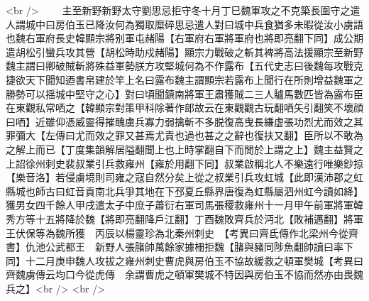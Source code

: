 <br />
　　主至新野新野太守劉思忌拒守冬十月丁巳魏軍攻之不克築長圍守之遣人謂城中曰房伯玉已降汝何為獨取糜碎思忌遣人對曰城中兵食猶多未暇從汝小虜語也魏右軍府長史韓顯宗將别軍屯赭陽【右軍府右軍將軍府也將即亮翻下同】成公期遣胡松引蠻兵攻其營【胡松時助戍赭陽】顯宗力戰破之斬其裨將高法援顯宗至新野魏主謂曰卿破賊斬將殊益軍勢朕方攻堅城何為不作露布【五代史志曰後魏每攻戰克捷欲天下聞知迺書帛建於竿上名曰露布魏主謂顯宗若露布上聞行在所則增益魏軍之勝勢可以揺城中堅守之心】對曰頃聞鎮南將軍王肅獲賊二三人驢馬數匹皆為露布臣在東觀私常哂之【韓顯宗對策甲科除著作郎故云在東觀觀古玩翻哂矢引翻笑不壞顔曰哂】近雖仰憑威靈得摧醜虜兵寡力弱擒斬不多脱復高曳長縑虚張功烈尤而效之其罪彌大【左傳曰尤而效之罪又甚焉尤責也過也甚之之辭也復扶又翻】臣所以不敢為之解上而已【丁度集韻解居隘翻聞上也上時掌翻自下而閒於上謂之上】魏主益賢之上詔徐州刺史裴叔業引兵救雍州【雍於用翻下同】叔業啟稱北人不樂遠行唯樂鈔掠【樂音洛】若侵虜境則司雍之寇自然分矣上從之叔業引兵攻虹城【此即漢沛郡之虹縣城也師古曰虹音貢南北兵爭其地在下邳夏丘縣界唐復為虹縣屬泗州虹今讀如絳】獲男女四千餘人甲戌遣太子中庶子蕭衍右軍司馬張稷救雍州十一月甲午前軍將軍韓秀方等十五將降於魏【將即亮翻降戶江翻】丁酉魏敗齊兵於沔北【敗補邁翻】將軍王伏保等為魏所獲　丙辰以楊靈珍為北秦州刺史　【考異曰齊氐傳作北梁州今從齊書】仇池公武都王　新野人張䐗帥萬餘家據柵拒魏【䐗與豬同陟魚翻帥讀曰率下同】十二月庚申魏人攻拔之雍州刺史曹虎與房伯玉不協故緩救之頓軍樊城【考異曰齊魏虜傳云均口今從虎傳　余謂曹虎之頓軍樊城不特因與房伯玉不協而然亦由畏魏兵之】<br />
<br />
